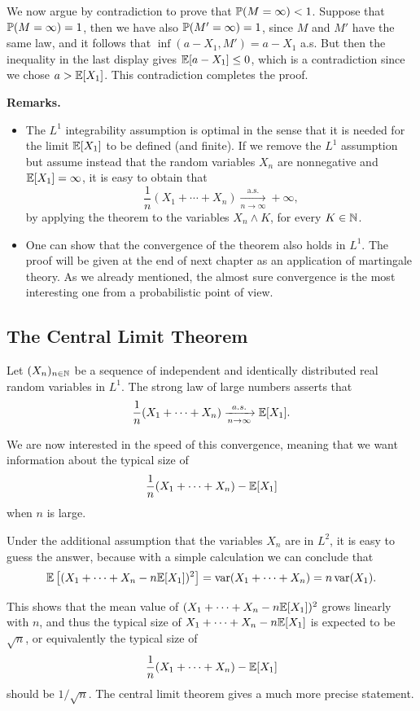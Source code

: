 \documentclass[../Main.tex]{subfiles}
\begin{document}
{We now argue by contradiction to prove that $\mathbb{P}(M = \infty) < 1$. Suppose that $\mathbb{P}(M = \infty) = 1$, then we have also $\mathbb{P}(M' = \infty) = 1$, since $M$ and $M'$ have the same law, and it follows that $\inf(a - X_1, M') = a - X_1$ a.s. But then the inequality in the last display gives $\mathbb{E}[a - X_1] \le 0$, which is a contradiction since we chose $a > \mathbb{E}[X_1]$. This contradiction completes the proof.
}

\textbf{Remarks.}
\begin{itemize}
    \item  The $L^1$ integrability assumption is optimal in the sense that it is needed for the limit $\mathbb{E}[X_1]$ to be defined (and finite). If we remove the $L^1$ assumption but assume instead that the random variables $X_n$ are nonnegative and $\mathbb{E}[X_1] = \infty$, it is easy to obtain that
    \[ \frac{1}{n}(X_1 + \cdots + X_n) \xrightarrow[n \to \infty]{\mathrm{a.s.}} +\infty, \]
    by applying the theorem to the variables $X_n \wedge K$, for every $K \in \mathbb{N}$.

    \item  One can show that the convergence of the theorem also holds in $L^1$. The proof will be given at the end of next chapter as an application of martingale theory. As we already mentioned, the almost sure convergence is the most interesting one from a probabilistic point of view.
\end{itemize}



\subsection{The Central Limit Theorem}
Let $(X_n)_{n \in \mathbb{N}}$ be a sequence of independent and identically distributed real random variables in $L^1$. The strong law of large numbers asserts that
\[ \frac{1}{n}(X_1 + \cdots + X_n) \xrightarrow[n \to \infty]{a.s.} \mathbb{E}[X_1]. \]

We are now interested in the speed of this convergence, meaning that we want information about the typical size of
\[
\frac{1}{n}(X_1 + \cdots + X_n) - \mathbb{E}[X_1]
\]
when $n$ is large.

Under the additional assumption that the variables $X_n$ are in $L^2$, it is easy to guess the answer, because with a simple calculation we can conclude that 
\[
\mathbb{E}\left[(X_1 + \cdots + X_n - n\mathbb{E}[X_1])^2\right] = \mathrm{var}(X_1 + \cdots + X_n) = n\,\mathrm{var}(X_1).
\]

This shows that the mean value of $(X_1 + \cdots + X_n - n\mathbb{E}[X_1])^2$ grows linearly with $n$, and thus the typical size of $X_1 + \cdots + X_n - n\mathbb{E}[X_1]$ is expected to be $\sqrt{n}$, or equivalently the typical size of
\[ \frac{1}{n}(X_1 + \cdots + X_n) - \mathbb{E}[X_1] \]
should be $1/\sqrt{n}$. The central limit theorem gives a much more precise statement.
\end{document}
